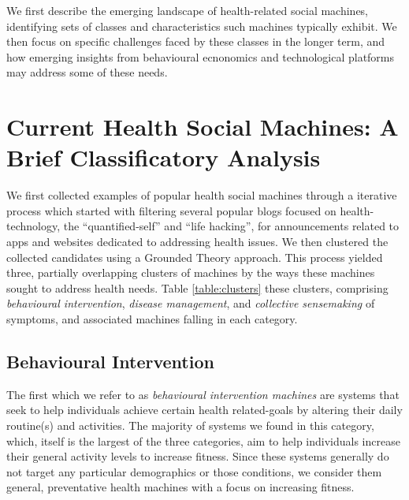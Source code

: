 \documentclass{sig-alternate}
\begin{document}
We first describe the emerging landscape of health-related social
machines, identifying sets of classes and characteristics such
machines typically exhibit.  We then focus on specific challenges
faced by these classes in the longer term, and how emerging insights
from behavioural ecnonomics and technological platforms may address
some of these needs.

\section{Current Health Social Machines: A Brief Classificatory Analysis}

We first collected examples of popular health social machines through
a iterative process which started with filtering several popular blogs
focused on health-technology, the ``quantified-self'' and ``life
hacking'', for announcements related to apps and websites dedicated to
addressing health issues. We then clustered the collected candidates
using a Grounded Theory approach.  This process yielded three,
partially overlapping clusters of machines by the ways these machines
sought to address health needs.  Table \ref{table:clusters} these
clusters, comprising \emph{behavioural intervention}, \emph{disease
  management}, and \emph{collective sensemaking} of symptoms, and
associated machines falling in each category.

\subsection{Behavioural Intervention}

The first which we refer to as \emph{behavioural intervention
  machines} are systems that seek to help individuals achieve certain
health related-goals by altering their daily routine(s) and
activities.  The majority of systems we found in this category, which,
itself is the largest of the three categories, aim to help individuals
increase their general activity levels to increase fitness.  Since
these systems generally do not target any particular demographics or
those conditions, we consider them general, preventative health
machines with a focus on increasing fitness.
\end{document}
